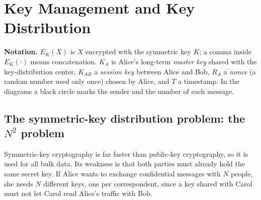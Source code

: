 \section{Key Management and Key Distribution}\label{sec:keymgmt}
\usetikzlibrary{decorations.pathreplacing}
\providecommand{\kmLife}[3]{\node[kmact] at (#1,0) {#2}; \draw[gray!80] (#1,-0.32) -- (#1,#3);}
\providecommand{\kmMsg}[5]{\node[kmn] (kmN) at (#2,#1) {#4}; \draw[kmm] (kmN) -- node[above, font=\footnotesize, inner sep=1.5pt, align=center, fill=white]{#5} (#3,#1);}
\providecommand{\kmK}[1]{K_{\text{#1}}}

\textbf{Notation.} $E_K(X)$ is $X$ encrypted with the symmetric key $K$; a comma inside $E_K(\cdot)$ means concatenation. $K_A$ is Alice's long-term \emph{master key} shared with the key-distribution center, $K_{AB}$ a \emph{session key} between Alice and Bob, $R_A$ a \emph{nonce} (a random number used only once) chosen by Alice, and $T$ a timestamp. In the diagrams a black circle marks the sender and the number of each message.

\subsection{The symmetric-key distribution problem: the $N^2$ problem \new}

Symmetric-key cryptography is far faster than public-key cryptography, so it is used for all bulk data. Its weakness is that both parties must already hold the same secret key. If Alice wants to exchange confidential messages with $N$ people, she needs $N$ different keys, one per correspondent, since a key shared with Carol must not let Carol read Alice's traffic with Bob.

